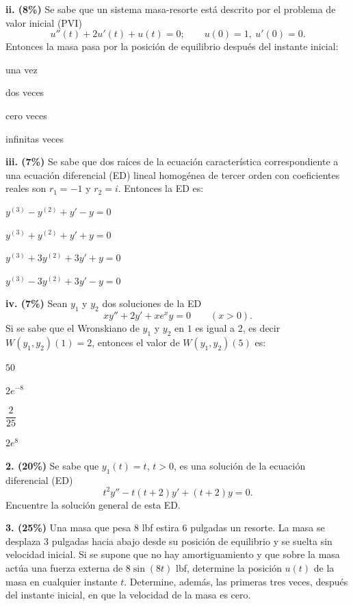 \documentclass[11pt]{article}
\providecommand{\nota}[1]{\par\smallskip\noindent{\small\itshape\color{unalblue}#1}\par\smallskip}
\begin{document}
\vspace{0.25cm}
\noindent\textbf{ii. (8\%)} Se sabe que un sistema masa-resorte está descrito por el problema de valor inicial (PVI)
\[
u''(t)+2u'(t)+u(t)=0;\qquad u(0)=1,\ u'(0)=0.
\]
Entonces la masa pasa por la posición de equilibrio después del instante inicial:
\begin{opciones}
\item una vez
\item dos veces
\item cero veces
\item infinitas veces
\end{opciones}

\vspace{0.25cm}
\noindent\textbf{iii. (7\%)} Se sabe que dos raíces de la ecuación característica correspondiente a una ecuación diferencial (ED) lineal homogénea de tercer orden con coeficientes reales son $r_1=-1$ y $r_2=i$. Entonces la ED es:
\begin{opciones}
\item $y^{(3)}-y^{(2)}+y'-y=0$
\item $y^{(3)}+y^{(2)}+y'+y=0$
\item $y^{(3)}+3y^{(2)}+3y'+y=0$
\item $y^{(3)}-3y^{(2)}+3y'-y=0$
\end{opciones}

\vspace{0.25cm}
\noindent\textbf{iv. (7\%)} Sean $y_1$ y $y_2$ dos soluciones de la ED
\[
xy''+2y'+xe^xy=0 \qquad (x>0).
\]
Si se sabe que el Wronskiano de $y_1$ y $y_2$ en $1$ es igual a $2$, es decir $W(y_1,y_2)(1)=2$, entonces el valor de $W(y_1,y_2)(5)$ es:
\begin{opciones}
\item $50$
\item $2e^{-8}$
\item $\dfrac{2}{25}$
\item $2e^{8}$
\end{opciones}
\nota{Sugerencia: use el teorema de Abel.}

\newpage

\noindent\textbf{2. (20\%)} Se sabe que $y_1(t)=t$, $t>0$, es una solución de la ecuación diferencial (ED)
\[
t^2y''-t(t+2)y'+(t+2)y=0.
\]
Encuentre la solución general de esta ED.

\vspace{9cm}

\newpage

\noindent\textbf{3. (25\%)} Una masa que pesa 8 lbf estira 6 pulgadas un resorte. La masa se desplaza 3 pulgadas hacia abajo desde su posición de equilibrio y se suelta sin velocidad inicial. Si se supone que no hay amortiguamiento y que sobre la masa actúa una fuerza externa de $8\sin(8t)$ lbf, determine la posición $u(t)$ de la masa en cualquier instante $t$. Determine, además, las primeras tres veces, después del instante inicial, en que la velocidad de la masa es cero.
\end{document}
